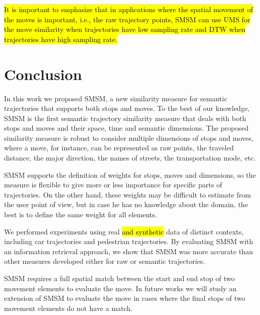 \documentclass[12pt]{article}
\begin{document}
\hl{It is important to emphasize that in applications where the spatial movement of the moves is important, i.e., the raw trajectory points, SMSM can use UMS for the move similarity when trajectories have low sampling rate and DTW when trajectories have high sampling rate.}


\section{Conclusion} \label{sec:conclusions}
In this work we proposed SMSM, a new similarity measure for semantic trajectories that supports both stops and moves.  To the best of our knowledge, SMSM is the first semantic trajectory similarity measure that deals with both stops and moves and their space, time and semantic dimensions. The proposed similarity measure is robust  to consider multiple dimensions of stops and moves, where a move, for instance, can be represented as raw points, the traveled distance, the major direction, the names of streets, the transportation mode, etc.

SMSM supports the definition of weights for stops, moves and dimensions, so the measure is flexible to give more or less importance for specific parts of trajectories. On the other hand, these weights may be difficult to estimate from the user point of view, but in case he has no knowledge about the domain, the best is to define the same weight for all elements.

We performed experiments using real \hl{and synthetic} data of distinct contexts, including car trajectories and pedestrian trajectories. By evaluating SMSM with an information retrieval approach, we show that SMSM was more accurate than other measures developed either for raw or semantic trajectories.

SMSM requires a full spatial match between the start and end stop of two movement elements to evaluate the move. In future works we will study an extension of SMSM to evaluate the move in cases where the final stops of two movement elements do not have a match.



\end{document}
